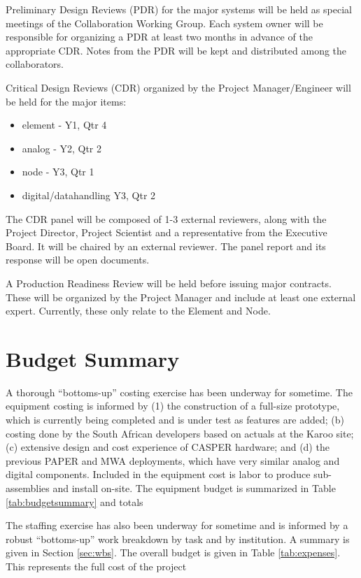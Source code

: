 \documentclass[preprint]{aastex}
\begin{document}
Preliminary Design Reviews (PDR) for the major systems will be held as special meetings 
of the Collaboration Working Group.  Each system owner will be responsible for organizing
a PDR at least two months in advance of the appropriate CDR.  Notes from the PDR will be
kept and distributed among the collaborators.

Critical Design Reviews (CDR) organized by the Project Manager/Engineer will be 
held for the major items:  
\begin{itemize}[noitemsep,nolistsep]
\item element - Y1, Qtr 4
\item analog - Y2, Qtr 2
\item node - Y3, Qtr 1
\item digital/datahandling Y3, Qtr 2
\end{itemize}

The CDR panel will be composed of 1-3 external reviewers, along with the Project
Director, Project Scientist and a representative
from the Executive Board. It will be chaired by an external reviewer. The panel
report and its response will be open documents.

A Production Readiness Review will be held before issuing major contracts.  These will
be organized by the Project Manager and include at least one external expert.  Currently, these
only relate to the Element and Node.


\section{Budget Summary}
\label{sec:budget}
A thorough ``bottoms-up'' costing exercise has been underway for sometime. The
equipment costing is informed by (1) the construction of a full-size prototype, which
is currently being completed and is under test as features are added; (b) costing
done by the South African developers based on actuals at the Karoo site; (c)
extensive design and cost experience of CASPER hardware; and (d) the previous PAPER
and MWA deployments, which have very similar analog and digital components. Included
in the equipment cost is labor to produce sub-assemblies and install on-site. The
equipment budget is summarized in Table \ref{tab:budgetsummary} and totals


The staffing exercise has also been underway for sometime and is informed by a robust
``bottoms-up'' work breakdown by task and by institution. A summary is given in Section \ref{sec:wbs}.
The overall budget is given in Table \ref{tab:expenses}.  This represents the full cost of the project

\end{document}
